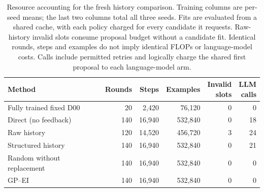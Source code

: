 \begin{table}[htbp]
\caption{Resource accounting for the fresh history comparison. Training columns are per-seed means; the last two columns total all three seeds. Fits are evaluated from a shared cache, with each policy charged for every candidate it requests. Raw-history invalid slots consume proposal budget without a candidate fit. Identical rounds, steps and examples do not imply identical FLOPs or language-model costs. Calls include permitted retries and logically charge the shared first proposal to each language-model arm.}
\label{tab:fresh-history-cost}
\centering\small
\setlength{\tabcolsep}{3pt}
\begin{tabularx}{\linewidth}{@{}Xrrrrr@{}}
\toprule
Method & Rounds & Steps & Examples & \shortstack{Invalid\\slots} & \shortstack{LLM\\calls} \\
\midrule
Fully trained fixed D00 & 20 & 2,420 & 76,120 & 0 & 0 \\
Direct (no feedback) & 140 & 16,940 & 532,840 & 0 & 18 \\
Raw history & 120 & 14,520 & 456,720 & 3 & 24 \\
Structured history & 140 & 16,940 & 532,840 & 0 & 21 \\
Random without replacement & 140 & 16,940 & 532,840 & 0 & 0 \\
GP--EI & 140 & 16,940 & 532,840 & 0 & 0 \\
\bottomrule
\end{tabularx}
\end{table}
